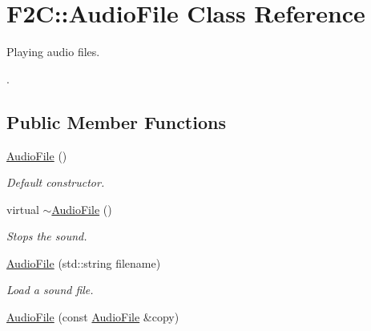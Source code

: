 \hypertarget{class_f2_c_1_1_audio_file}{
\section{F2C::AudioFile Class Reference}
\label{class_f2_c_1_1_audio_file}
}


Playing audio files. \par
.  
\subsection*{Public Member Functions}
\begin{DoxyCompactItemize}
\item 
\hypertarget{class_f2_c_1_1_audio_file_a2dc6525f4cbcaaebc66a3a4874cefd1f}{
\hyperlink{class_f2_c_1_1_audio_file_a2dc6525f4cbcaaebc66a3a4874cefd1f}{AudioFile} ()}
\label{class_f2_c_1_1_audio_file_a2dc6525f4cbcaaebc66a3a4874cefd1f}

\begin{DoxyCompactList}\small\item\em Default constructor. \item\end{DoxyCompactList}\item 
\hypertarget{class_f2_c_1_1_audio_file_a3420155d514c949628e5220902f84e51}{
virtual \hyperlink{class_f2_c_1_1_audio_file_a3420155d514c949628e5220902f84e51}{$\sim$AudioFile} ()}
\label{class_f2_c_1_1_audio_file_a3420155d514c949628e5220902f84e51}

\begin{DoxyCompactList}\small\item\em Stops the sound. \item\end{DoxyCompactList}\item 
\hyperlink{class_f2_c_1_1_audio_file_ab577e396b7f73828fe95cf1792f7767a}{AudioFile} (std::string filename)
\begin{DoxyCompactList}\small\item\em Load a sound file. \item\end{DoxyCompactList}\item 
\hypertarget{class_f2_c_1_1_audio_file_a789f70c02b96a57447d4d71d5b8e4c24}{
\hyperlink{class_f2_c_1_1_audio_file_a789f70c02b96a57447d4d71d5b8e4c24}{AudioFile} (const \hyperlink{class_f2_c_1_1_audio_file}{AudioFile} \&copy)}
\label{class_f2_c_1_1_audio_file_a789f70c02b96a57447d4d71d5b8e4c24}


\end{DoxyCompactItemize}
